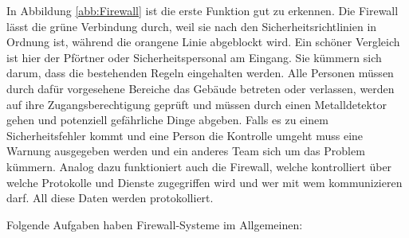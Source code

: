 In Abbildung \ref{abb:Firewall} ist die erste Funktion gut zu erkennen. Die Firewall lässt die grüne Verbindung durch, weil sie nach den Sicherheitsrichtlinien in Ordnung ist, während die orangene Linie abgeblockt wird. Ein schöner Vergleich ist hier der Pförtner oder Sicherheitspersonal am Eingang. Sie kümmern sich darum, dass die bestehenden Regeln eingehalten werden. Alle Personen müssen durch dafür vorgesehene Bereiche das Gebäude betreten oder verlassen, werden auf ihre Zugangsberechtigung geprüft und müssen durch einen Metalldetektor gehen und potenziell gefährliche Dinge abgeben. Falls es zu einem Sicherheitsfehler kommt und eine Person die Kontrolle umgeht muss eine Warnung ausgegeben werden und ein anderes Team sich um das Problem kümmern. Analog dazu funktioniert auch die Firewall, welche kontrolliert über welche Protokolle und Dienste zugegriffen wird und wer mit wem kommunizieren darf. All diese Daten werden protokolliert. \footnotemark
{}

Folgende Aufgaben haben Firewall-Systeme im Allgemeinen:

